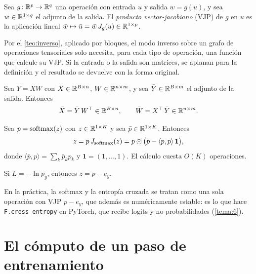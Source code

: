 \begin{definicion}\label{def:vjp}
Sea $g\colon\mathbb{R}^{p}\to\mathbb{R}^{q}$ una operación con entrada $u$ y salida $w=g(u)$, y sea $\bar w\in\mathbb{R}^{1\times q}$ el adjunto de la salida. El \emph{producto vector-jacobiano} (VJP) de $g$ en $u$ es la aplicación lineal $\bar w\mapsto\bar u=\bar w\,J_g(u)\in\mathbb{R}^{1\times p}$.
\end{definicion}

Por el \cref{teo:inverso}, aplicado por bloques, el modo inverso sobre un grafo de operaciones tensoriales solo necesita, para cada tipo de operación, una función que calcule su VJP. Si la entrada o la salida son matrices, se aplanan para la definición y el resultado se devuelve con la forma original.

\addtocounter{definicion}{1}%

\begin{proposicion}\label{prop:vjp-lineal}
Sea $Y=XW$ con $X\in\mathbb{R}^{B\times n}$, $W\in\mathbb{R}^{n\times m}$, y sea $\bar Y\in\mathbb{R}^{B\times m}$ el adjunto de la salida. Entonces
\[
\bar X=\bar Y\,W^{\top}\in\mathbb{R}^{B\times n},\qquad \bar W=X^{\top}\,\bar Y\in\mathbb{R}^{n\times m}.
\]
\end{proposicion}

\addtocounter{definicion}{1}%

\begin{proposicion}\label{prop:vjp-softmax}
Sea $p=\operatorname{softmax}(z)$ con $z\in\mathbb{R}^{1\times K}$ y sea $\bar p\in\mathbb{R}^{1\times K}$. Entonces
\[
\bar z=\bar p\,J_{\operatorname{softmax}}(z)=p\odot\bigl(\bar p-\langle\bar p,p\rangle\,\mathbf{1}\bigr),
\]
donde $\langle\bar p,p\rangle=\sum_k\bar p_kp_k$ y $\mathbf 1=(1,\dots,1)$. El cálculo cuesta $O(K)$ operaciones.
\end{proposicion}

\begin{corolario}\label{cor:ce}
Si $L=-\ln p_y$, entonces $\bar z=p-e_y$.
\end{corolario}

En la práctica, la softmax y la entropía cruzada se tratan como una sola operación con VJP $p-e_y$, que además es numéricamente estable: es lo que hace \texttt{F.cross\_entropy} en PyTorch, que recibe logits y no probabilidades (\cref{tema:6}).

\section{El cómputo de un paso de entrenamiento}

